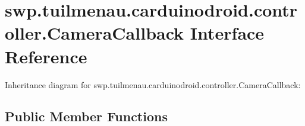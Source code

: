 \hypertarget{interfaceswp_1_1tuilmenau_1_1carduinodroid_1_1controller_1_1_camera_callback}{}\section{swp.\+tuilmenau.\+carduinodroid.\+controller.\+Camera\+Callback Interface Reference}
\label{interfaceswp_1_1tuilmenau_1_1carduinodroid_1_1controller_1_1_camera_callback}


Inheritance diagram for swp.\+tuilmenau.\+carduinodroid.\+controller.\+Camera\+Callback\+:
\subsection*{Public Member Functions}
